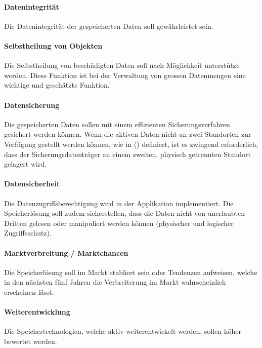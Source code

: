 \setcounter{paragraph}{0}
\renewcommand\theparagraph{Soll-5-\arabic{paragraph}}

\paragraph{Datenintegrität}\label{Soll-5-1}
Die Datenintegrität der gespeicherten Daten soll gewährleistet sein.

\paragraph{Selbstheilung von Objekten}\label{Soll-5-2}
Die Selbstheilung von beschädigten Daten soll nach Möglichkeit unterstützt werden. Diese Funktion ist bei der Verwaltung von grossen Datenmengen eine wichtige und geschätzte Funktion.

\paragraph{Datensicherung}\label{Soll-5-3}
Die gespeicherten Daten sollen mit einem effizienten Sicherungsverfahren gesichert werden können. Wenn die aktiven Daten nicht an zwei Standorten zur Verfügung gestellt werden können, wie in () definiert, ist es zwingend erforderlich, dass der Sicherungsdatenträger an einem zweiten, physisch getrennten Standort gelagert wird.

\paragraph{Datensicherheit}\label{Soll-5-4}
Die Datenzugriffsberechtigung wird in der Applikation implementiert. Die Speicherlösung soll zudem sicherstellen, dass die Daten nicht von unerlaubten Dritten gelesen oder manipuliert werden können (physischer und logischer Zugriffsschutz).

\setcounter{paragraph}{0}
\renewcommand\theparagraph{Soll-6-\arabic{paragraph}}

\paragraph{Marktverbreitung / Marktchancen}\label{Soll-6-1}
Die Speicherlösung soll im Markt etabliert sein oder Tendenzen aufweisen, welche in den nächsten fünf Jahren die Verbreiterung im Markt wahrscheinlich erscheinen lässt.

\paragraph{Weiterentwicklung}\label{Soll-6-2}
Die Speichertechnologien, welche aktiv weiterentwickelt werden, sollen höher bewertet werden.

